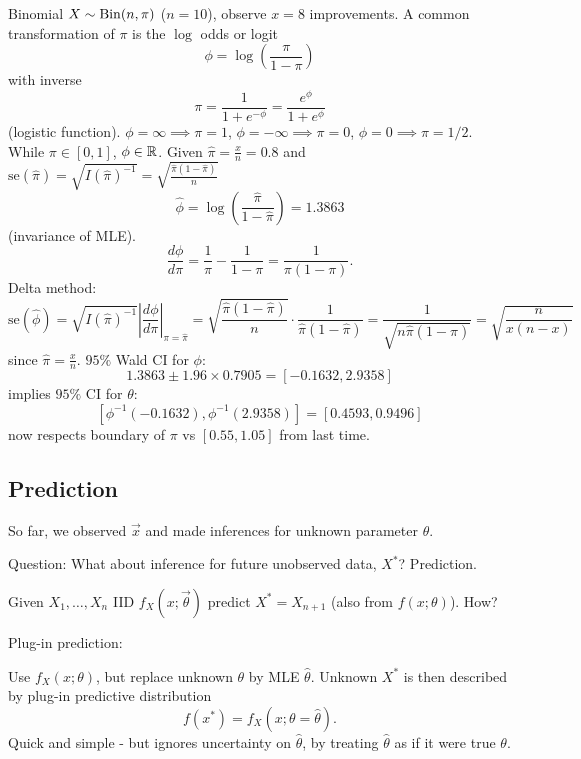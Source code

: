 \documentclass[10pt, a4paper]{article}
\begin{document}
\begin{example}
    Binomial $X \sim \operatorname{Bin}(n, \pi)$
    ($n = 10$),
    observe $x = 8$ improvements.
    A common transformation of $\pi$ is the $\log$ odds or logit
    \[
    \phi = \log\left(\frac{\pi}{1 - \pi}\right)
    \]
    with inverse
    \[
    \pi = \frac{1}{1 + e ^ {-\phi}} = \frac{e ^ {\phi}}{1 + e ^ {\phi}}
    \]
    (logistic function).
    $\phi = \infty \implies \pi = 1$,
    $\phi = -\infty \implies \pi = 0$,
    $\phi = 0 \implies \pi = 1 / 2$.
    While $\pi \in [0, 1]$,
    $\phi \in \mathbb{R}$.
    Given $\hat{\pi} = \frac{x}{n} = 0.8$ and $\mathrm{se}(\hat{\pi}) = \sqrt{I(\hat{\pi}) ^ {-1}} = \sqrt{\frac{\hat{\pi}(1 - \hat{\pi})}{n}}$
    \[
    \hat{\phi} = \log\left(\frac{\hat{\pi}}{1 - \hat{\pi}}\right) = 1.3863
    \]
    (invariance of MLE).
    \[
    \frac{d\phi}{d\pi} = \frac{1}{\pi} - \frac{1}{1 - \pi} = \frac{1}{\pi(1 - \pi)}.
    \]
    Delta method:
    \[
    \mathrm{se}(\hat{\phi}) = \sqrt{I(\hat{\pi}) ^ {-1}}\left|\frac{d\phi}{d\pi}\right|_{\pi = \hat{\pi}} = \sqrt{\frac{\hat{\pi}(1 - \hat{\pi})}{n}}\cdot\frac{1}{\hat{\pi}(1 - \hat{\pi})} = \frac{1}{\sqrt{n\hat{\pi}(1 - \hat{\pi})}} = \sqrt{\frac{n}{x(n - x)}}
    \]
    since $\hat{\pi} = \frac{x}{n}$.
    $95\%$ Wald CI for $\phi$:
    \[
    1.3863 \pm 1.96 \times 0.7905 = [-0.1632, 2.9358]
    \]
    implies $95\%$ CI for $\theta$:
    \[
    [\phi ^ {-1}(-0.1632), \phi ^ {-1}(2.9358)] = [0.4593, 0.9496]
    \]
    now respects boundary of $\pi$ vs $[0.55, 1.05]$ from last time.
\end{example}

\subsection{Prediction}
So far,
we observed $\vec{x}$ and made inferences for unknown parameter $\theta$.

Question:
What about inference for future unobserved data,
$X ^ {*}$?
Prediction.

Given $X_1, \dotsc, X_n$ IID $f_{X}(x; \vec{\theta})$ predict $X ^ {*} = X_{n + 1}$
(also from $f(x; \theta)$).
How?

Plug-in prediction:

Use $f_{X}(x; \theta)$,
but replace unknown $\theta$ by MLE $\hat{\theta}$.
Unknown $X ^ {*}$ is then described by plug-in predictive distribution
\[
f(x ^ {*}) = f_{X}(x; \theta = \hat{\theta}).
\]
Quick and simple -
but ignores uncertainty on $\hat{\theta}$,
by treating $\hat{\theta}$ as if it were true $\theta$.
\end{document}
